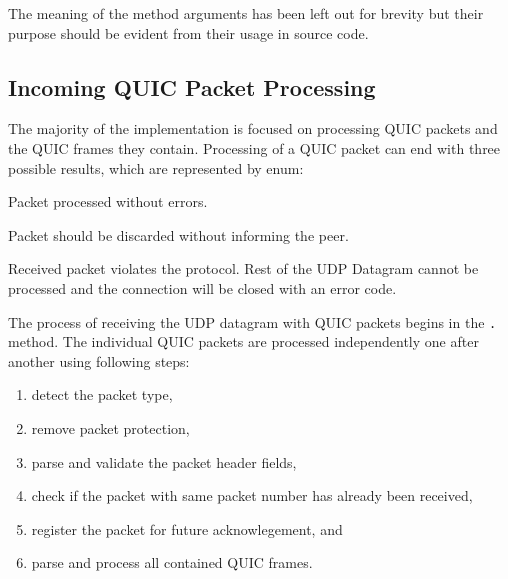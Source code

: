 The meaning of the method arguments has been left out for brevity but their purpose should be
evident from their usage in source code.

\subsection{Incoming QUIC Packet Processing}

The majority of the \ManagedQuicConnection{} implementation is focused on processing QUIC packets
and the QUIC frames they contain. Processing of a QUIC packet can end with three possible results,
which are represented by \ProcessPacketResult{} enum:

\begin{itemize}

   Packet processed without errors.

   Packet should be discarded without informing the peer.

   Received packet violates the protocol. Rest of the UDP Datagram cannot be processed and the connection will be closed with an error code.

\end{itemize}

The process of receiving the UDP datagram with QUIC packets begins in the \texttt{\ManagedQuicConnection{}.}
method. The individual QUIC packets are processed independently one after another using following
steps:

\begin{enumerate}

  \item detect the packet type,

  \item remove packet protection,

  \item parse and validate the packet header fields,

  \item check if the packet with same packet number has already been received,

  \item register the packet for future acknowlegement, and

  \item parse and process all contained QUIC frames.

\end{enumerate}


